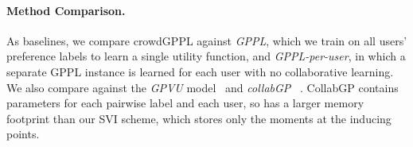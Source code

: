 \paragraph{Method Comparison. }



As baselines, we compare crowdGPPL against 
\emph{GPPL},
which we train on all users' preference labels to learn a single utility function,
and \emph{GPPL-per-user},
in which a separate GPPL instance is learned for each user with no collaborative
learning.
We also compare against the \emph{GPVU} model~\citep{khan2014scalable} 
and 
\emph{collabGP} ~\citep{houlsby2012collaborative}.
CollabGP contains parameters for each pairwise label and
 each user, so has a larger memory footprint than our SVI scheme, 
which stores only the moments at the inducing points.

